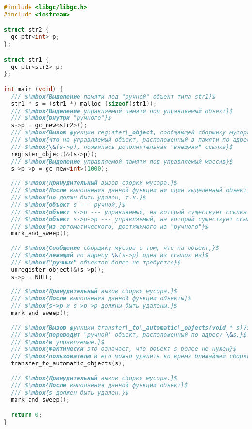 \begin{lstlisting}[language= cpp, mathescape=true, caption=Совмещение ручного и автоматического управления памятью]
#include <libgc/libgc.h>
#include <iostream>

struct str2 {
  gc_ptr<int> p;
};

struct str1 {
  gc_ptr<str2> p;
};

int main (void) {
  /// $\mbox{Выделение памяти под "ручной" объект типа str1}$
  str1 * s = (str1 *) malloc (sizeof(str1));
  /// $\mbox{Выделение управляемой памяти под управляемый объект}$
  /// $\mbox{внутри "ручного"}$
  s->p = gc_new<str2>();
  /// $\mbox{Вызов функции register\_object, сообщающей сборщику мусора,}$
  /// $\mbox{что на управляемый объект, расположенный в памяти по адресу}$
  /// $\mbox{\&(s->p), появилась дополнительная "внешняя" ссылка}$
  register_object(&(s->p));
  /// $\mbox{Выделение управляемой памяти под управляемый массив}$
  s->p->p = gc_new<int>(1000);
  
  /// $\mbox{Принудительный вызов сборки мусора.}$
  /// $\mbox{После выполнения данной функции ни один выделенный объект}$
  /// $\mbox{не должн быть удален, т.к.}$
  /// $\mbox{объект s --- ручной,}$
  /// $\mbox{объект s->p --- управляемый, на который существует ссылка из ручного,}$
  /// $\mbox{объект s->p->p --- управляемый, на который существует ссылка}$
  /// $\mbox{из автоматического, достижимого из "ручного"}$
  mark_and_sweep();
  
  /// $\mbox{Сообщение сборщику мусора о том, что на объект,}$
  /// $\mbox{лежащий по адресу \&(s->p) одна из ссылок из}$
  /// $\mbox{"ручных" объектов более не требуется}$
  unregister_object(&(s->p));
  s->p = NULL;
  
  /// $\mbox{Принудительный вызов сборки мусора.}$
  /// $\mbox{После выполнения данной функции объекты}$
  /// $\mbox{s->p и s->p->p должны быть удалены.}$
  mark_and_sweep();
  
  /// $\mbox{Вызов функции transfer\_to\_automatic\_objects(void * s)}$
  /// $\mbox{переводит "ручной" объект, расположенный по адресу \&s,}$
  /// $\mbox{в управляемые.}$
  /// $\mbox{Фактически это означает, что объект s более не нужен}$
  /// $\mbox{пользователю и его можно удалить во время ближайшей сборки мусора}$
  transfer_to_automatic_objects(s);
  
  /// $\mbox{Принудительный вызов сборки мусора.}$
  /// $\mbox{После выполнения данной функции объект}$
  /// $\mbox{s должен быть удален.}$
  mark_and_sweep();

  return 0;
}
\end{lstlisting}


